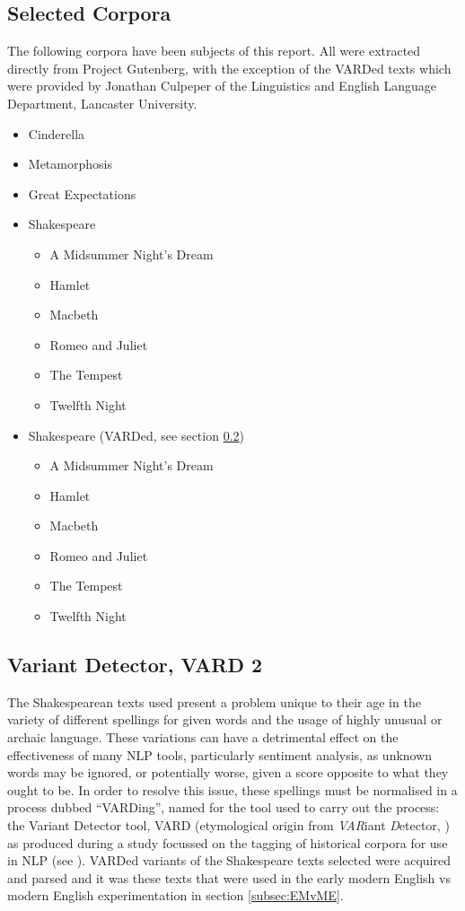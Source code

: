 \documentclass{article}
\begin{document}
{    \subsection{Selected Corpora}
    The following corpora have been subjects of this report. All were extracted directly from Project Gutenberg, with the exception of the VARDed texts which were provided by Jonathan Culpeper of the Linguistics and English Language Department, Lancaster University.
        \begin{itemize}
            \item Cinderella
            \item Metamorphosis
            \item Great Expectations
            \item Shakespeare
            \begin{itemize}
                \item A Midsummer Night's Dream
                \item Hamlet
                \item Macbeth
                \item Romeo and Juliet
                \item The Tempest
                \item Twelfth Night
            \end{itemize}
            \item Shakespeare (VARDed, see section \ref{subsec:vard})
            \begin{itemize}
                \item A Midsummer Night's Dream
                \item Hamlet
                \item Macbeth
                \item Romeo and Juliet
                \item The Tempest
                \item Twelfth Night
            \end{itemize}
        \end{itemize}
    \subsection{Variant Detector, VARD 2}
    \label{subsec:vard}
        The Shakespearean texts used present a problem unique to their age in the variety of different spellings for given words and the usage of highly unusual or archaic language. These variations can have a detrimental effect on the effectiveness of many NLP tools, particularly sentiment analysis, as unknown words may be ignored, or potentially worse, given a score opposite to what they ought to be. In order to resolve this issue, these spellings must be normalised in a process dubbed ``VARDing'', named for the tool used to carry out the process: the Variant Detector tool, VARD (etymological origin from \textit{VAR}iant \textit{D}etector, \cite{baron2008vard2}) as produced during a study focussed on the tagging of historical corpora for use in NLP (see \cite{rayson2007tagging}). VARDed variants of the Shakespeare texts selected were acquired and parsed and it was these texts that were used in the early modern English vs modern English experimentation in section \ref{subsec:EMvME}.
}
\end{document}
